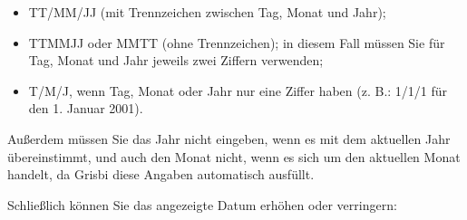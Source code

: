 \begin{itemize}
	\item TT/MM/JJ (mit Trennzeichen zwischen Tag, Monat und Jahr);
	\item TTMMJJ oder MMTT (ohne Trennzeichen); in diesem Fall müssen Sie für Tag, Monat und Jahr jeweils zwei Ziffern verwenden;
	\item T/M/J, wenn Tag, Monat oder Jahr nur eine Ziffer haben (z. B.: 1/1/1 für den 1. Januar 2001).
\end{itemize}

Außerdem müssen Sie das Jahr nicht eingeben, wenn es mit dem aktuellen Jahr übereinstimmt, und auch den Monat nicht, wenn es sich um den aktuellen Monat handelt, da Grisbi diese Angaben automatisch ausfüllt.

Schließlich können Sie das angezeigte Datum erhöhen oder verringern:

